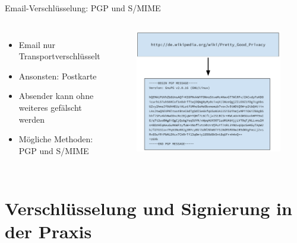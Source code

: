\documentclass[10pt]{beamer}
\begin{document}
%
%
\begin{frame}[fragile]{Email-Verschlüsselung: PGP und S/MIME}
\begin{columns}[T,c,onlytextwidth]
\begin{itemize}
	\item Email nur Transportverschlüsselt
\item Ansonsten: Postkarte
\item Absender kann ohne weiteres gefälscht werden
\item Mögliche Methoden: \\PGP und S/MIME
\end{itemize}
\begin{figure}
	\includegraphics[width=1\textwidth]{images/pgp}
\end{figure}
\end{columns}
\end{frame}

\section{Verschlüsselung und Signierung in der Praxis}
\end{document}
